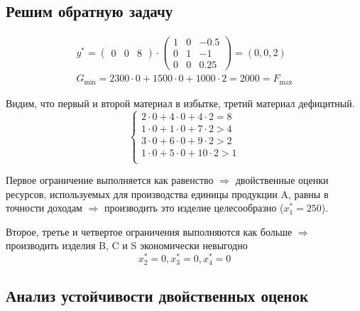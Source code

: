 \documentclass[17pt]{extarticle}
\begin{document}
\subsection*{Решим обратную задачу}

\[
    \begin{split}
        y^* =
        \begin{pmatrix}
            0 & 0 & 8
        \end{pmatrix}
        \cdot
        \begin{pmatrix}
            1 & 0 & -0.5 \\
            0 & 1 & -1   \\
            0 & 0 & 0.25
        \end{pmatrix}
        = (0, 0, 2) \\
        G_{\text{min}} = 2300 \cdot 0 + 1500 \cdot 0 + 1000 \cdot 2 = 2000 = F_{\text{max}}
    \end{split}
\]

Видим, что первый и второй материал в избытке, третий материал дефицитный.
\[
    \begin{cases}
        2 \cdot 0 + 4 \cdot 0 + 4 \cdot 2 = 8  \\
        1 \cdot 0 + 1 \cdot 0 + 7 \cdot 2 > 4  \\
        3 \cdot 0 + 6 \cdot 0 + 9 \cdot 2 > 2  \\
        1 \cdot 0 + 5 \cdot 0 + 10 \cdot 2 > 1 \\
    \end{cases}
\]

Первое ограничение выполняется как равенство
\(\Rightarrow\)
двойственные оценки ресурсов, используемых для производства единицы продукции A, равны в точности доходам
\(\Rightarrow\)
производить это изделие целесообразно (\(x^*_1 = 250\)).

Второе, третье и четвертое ограничения выполняются как больше
\(\Rightarrow\) производить изделия B, C и S экономически невыгодно
\[
    x^*_2 = 0, x^*_3 = 0, x^*_4 = 0
\]

\subsection*{Анализ устойчивости двойственных оценок}
\end{document}
